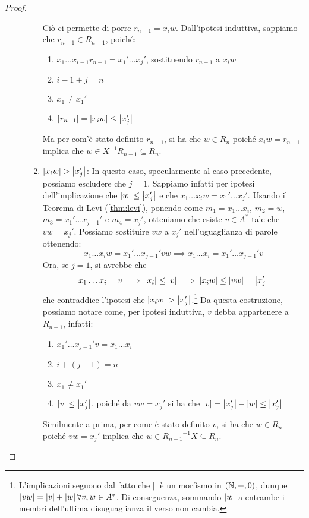 \begin{proof}
\begin{description}
\begin{enumerate}
          Ciò ci permette di porre \(r_{n-1} = x_{i}w\). Dall'ipotesi induttiva, sappiamo che \(r_{n-1} \in R_{n-1}\), poiché:
          \begin{enumerate}
            \item \(x_1\ldots x_{i-1}r_{n-1} = x_1'\ldots x_j'\), sostituendo \(r_{n-1}\) a \(x_{i}w\)
            \item \(i-1+j=n\)
            \item \(x_1 \neq x_1'\)
            \item \(\left|r_{n-1}\right| = \left|x_i w\right| \leq \left|x_j'\right|\)
          \end{enumerate}
          Ma per com'è stato definito \(r_{n-1}\), si ha che \(w \in R_n\) poiché \(x_{i} w = r_{n-1}\) implica che \(w \in X^{-1} R_{n-1} \subseteq R_n\).
        \item \(\left|x_{i}w\right| > \left|x_j'\right|\):
          In questo caso, specularmente al caso precedente, possiamo escludere che \(j=1\).
          Sappiamo infatti per ipotesi dell'implicazione che \(\left|w\right| \leq \left|x_j'\right|\) e che \(x_1\ldots x_i w = x_1'\ldots x_j'\). Usando il Teorema di Levi (\ref{thm:levi}), ponendo come \(m_1 = x_1\ldots x_i\), \(m_2 = w\), \(m_3 = x_1'\ldots x_{j-1}'\) e \(m_4 = x_j'\), otteniamo che esiste \(v \in A^*\) tale che \(vw=x_j'\).
          Possiamo sostituire \(vw\) a \(x_j'\) nell'uguaglianza di parole ottenendo:
          \[x_1\ldots x_i w = x_1'\ldots x_{j-1}' vw \implies x_1\ldots x_i = x_1'\ldots x_{j-1}' v \]
          Ora, se \(j=1\), si avrebbe che 
            \[x_1\ldots x_i = v \implies \left|x_i\right| \leq \left|v\right| \implies \left|x_i w\right| \leq \left|vw\right| = \left|x_j'\right| \]
          che contraddice l'ipotesi che \(\left|x_{i}w\right| > \left|x_j'\right|\).\footnote{L'implicazioni seguono dal fatto che \(||\) è un morfismo in \((\mathbb{N},+,0)\), dunque \(\left|vw\right| = \left|v\right|+\left|w\right| \forall v,w \in A^*\). Di conseguenza, sommando \(\left|w\right|\) a entrambe i membri dell'ultima disuguaglianza il verso non cambia.}
          Da questa costruzione, possiamo notare come, per ipotesi induttiva, \(v\) debba appartenere a \(R_{n-1}\), infatti:
          \begin{enumerate}
            \item \(x_1'\ldots x_{j-1}' v = x_1\ldots x_i\)
            \item \(i + (j-1) = n\)
            \item \(x_1 \neq x_1'\)
            \item \(\left|v\right| \leq \left|x_j'\right|\), poiché da \(vw = x_j'\) si ha che \(\left|v\right| = \left|x_j'\right| - \left|w\right| \leq \left|x_j'\right|\)
        \end{enumerate}
        Similmente a prima, per come è stato definito \(v\), si ha che \(w \in R_n\) poiché \(vw = x_j'\) implica che \(w \in {R_{n-1}}^{-1} X \subseteq R_n\).
      \end{enumerate}
  \end{description}
\end{proof}

